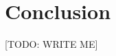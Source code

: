 \documentclass{article} %
\begin{document}




\section{Conclusion}
\label{sec:conclusion}

[TODO: WRITE ME]

\end{document}
